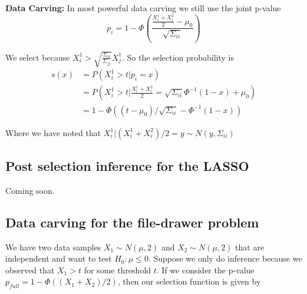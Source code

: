 \documentclass{article}
\begin{document}
\begin{appendix}
\textbf{Data Carving: } In most powerful data carving we still use the joint p-value 
\begin{equation*}
    p_i = 1 - \Phi\left( \frac{ \frac{X_i^1 + X_i^2}{2} - \mu_0}{\sqrt{\Sigma_{ii}}} \right) 
\end{equation*}

We select because $X^1_i > \sqrt{\frac{\Sigma_{ii}}{\Sigma_{jj}}} X^1_j$. So the selection probability is 
\begin{align*}
    s(x) &= P( X^1_i > t | p_i = x ) \\
         &=  P( X^1_i > t | \frac{X^1_i + X^2_i}{2} =  \sqrt{\Sigma_{ii}}\Phi^{-1}(1 -x) + \mu_0 )\\
         &= 1 - \Phi((t - \mu_0)/\sqrt{\Sigma_{ii}} - \Phi^{-1}(1 - x))
\end{align*}

Where we have noted that $X_i^1 |  (X_i^1 + X_i^2)/2 = y \sim N(y, \Sigma_{ii})$ 
\fi 

\subsection{Post selection inference for the LASSO}
\label{sec:lasso_appdx}

Coming soon. 

\subsection{Data carving for the file-drawer problem}
\label{sec:carve_appdx}

We have two data samples $X_1 \sim N(\mu, 2)$ and $X_2 \sim N(\mu, 2)$ that are independent and want to test $H_0 : \mu \leq 0$. Suppose we only do inference because we observed that $X_1  > t$ for some threshold $t$. If we consider the p-value $p_{full} = 1 - \Phi((X_1 + X_2)/2  )$, then our selection function is given by 


\end{appendix}
\end{document}
